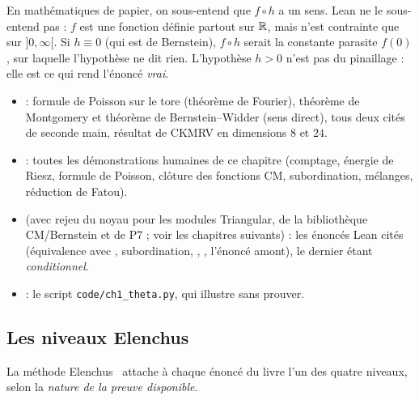 \begin{remark}
En mathématiques de papier, on sous-entend que $f\circ h$ a un sens. Lean ne le sous-entend pas : $f$ est une fonction définie partout sur $\mathbb{R}$, mais
n'est contrainte que sur $]0,\infty[$. Si $h\equiv0$ (qui est de Bernstein), $f\circ h$ serait la constante parasite $f(0)$, sur laquelle l'hypothèse ne dit rien. L'hypothèse
$h>0$ n'est pas du pinaillage : elle est ce qui rend l'énoncé \emph{vrai}.
\end{remark}

\begin{warnbox}
\begin{itemize}
\item \tierL{} : formule de Poisson sur le tore (théorème de Fourier), théorème de Montgomery et théorème de Bernstein--Widder (sens direct), tous deux cités de seconde main, résultat de CKMRV en dimensions $8$ et $24$.
\item \tierC{} : toutes les démonstrations humaines de ce chapitre (comptage, énergie de Riesz, formule de Poisson, clôture des fonctions CM, subordination, mélanges, réduction de Fatou).
\item \tierA{} (avec rejeu du noyau pour les modules Triangular, de la bibliothèque CM/Bernstein et de P7 ; voir les chapitres suivants) : les énoncés Lean cités (équivalence avec , subordination, , , l'énoncé amont), le dernier étant \emph{conditionnel}.
\item \tierX{} : le script \texttt{code/ch1\_theta.py}, qui illustre sans prouver.
\end{itemize}
\end{warnbox}

\subsection{Les niveaux Elenchus}
\label{ch1:sec:tiers}

La méthode Elenchus~\cite{elenchus} attache à chaque énoncé du livre l'un des quatre niveaux, selon la \emph{nature de la preuve disponible}.


